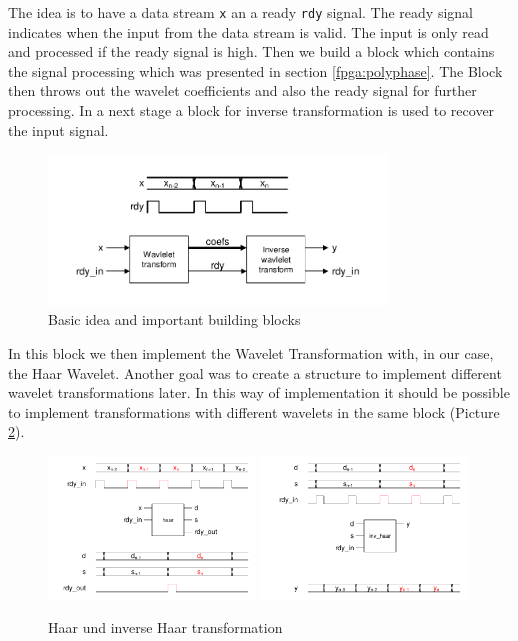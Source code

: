 \begin{refsection}
The idea is to have a data stream \texttt{x} an a ready \texttt{rdy} signal. The ready signal indicates when the input from the data stream is valid. The input is only read and processed if the ready signal is high. Then we build a block which contains the signal processing which was presented in section \ref{fpga:polyphase}. The Block then throws out the wavelet coefficients and also the ready signal for further processing. In a next stage a block for inverse transformation is used to recover the input signal.

\begin{figure}
	\centering
	\includegraphics[width=0.8\textwidth]{images/idea.pdf}
	\caption{Basic idea and important building blocks \label{fpga:idea}}
\end{figure}
In this block we then implement the Wavelet Transformation with, in our case, the Haar Wavelet. Another goal was to create a structure to implement different wavelet transformations later. In this way of implementation  it should be possible to implement transformations with different wavelets in the same block (Picture \ref{fpga:haar_inv_haar}). 

\begin{figure}[h]
	\includegraphics[width=0.49\textwidth]{images/haar.pdf}
	\includegraphics[width=0.49\textwidth]{images/inv_haar.pdf}
	\caption{Haar und inverse Haar transformation \label{fpga:haar_inv_haar}}
\end{figure}


\end{refsection}
